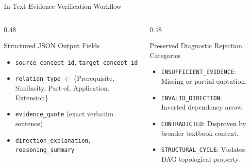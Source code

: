 \documentclass[aspectratio=169,10pt]{beamer}
\begin{document}
\begin{frame}{In-Text Evidence Verification Workflow}
    \vspace{0.4cm}
    \begin{columns}[T]
        \begin{column}{0.48\textwidth}
            \begin{block}{Structured JSON Output Fields}
                \tiny
                \begin{itemize}
                    \item \texttt{source\_concept\_id}, \texttt{target\_concept\_id}
                    \item \texttt{relation\_type} $\in$ \{Prerequisite, Similarity, Part-of, Application, Extension\}
                    \item \texttt{evidence\_quote} (exact verbatim sentence)
                    \item \texttt{direction\_explanation}, \texttt{reasoning\_summary}
                \end{itemize}
            \end{block}
        \end{column}
        \begin{column}{0.48\textwidth}
            \begin{block}{Preserved Diagnostic Rejection Categories}
                \tiny
                \begin{itemize}
                    \item \texttt{INSUFFICIENT\_EVIDENCE}: Missing or partial quotation.
                    \item \texttt{INVALID\_DIRECTION}: Inverted dependency arrow.
                    \item \texttt{CONTRADICTED}: Disproven by broader textbook context.
                    \item \texttt{STRUCTURAL\_CYCLE}: Violates DAG topological property.
                \end{itemize}
            \end{block}
        \end{column}
    \end{columns}
\end{frame}
\end{document}

